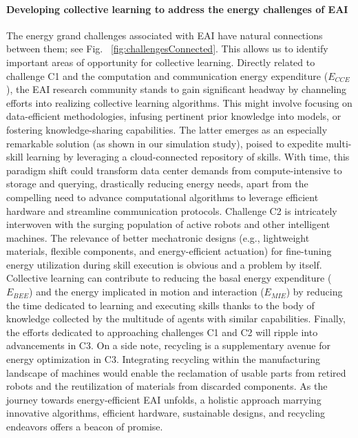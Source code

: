 \documentclass[12pt]{article}
\begin{document}
\paragraph*{Developing collective learning to address the energy challenges of EAI}
The energy grand challenges associated with EAI have natural connections between them; see Fig.~	\ref{fig:challengesConnected}. This allows us to identify important areas of opportunity for collective learning. Directly related to challenge C1 and the computation and communication energy expenditure ($E_{CCE}$), the EAI research community stands to gain significant headway by channeling efforts into realizing collective learning algorithms. This might involve focusing on data-efficient methodologies, infusing pertinent prior knowledge into models, or fostering knowledge-sharing capabilities. The latter emerges as an especially remarkable solution (as shown in our simulation study), poised to expedite multi-skill learning by leveraging a cloud-connected repository of skills. With time, this paradigm shift could transform data center demands from compute-intensive to storage and querying, drastically reducing energy needs, apart from the compelling need to advance computational algorithms to leverage efficient hardware and streamline communication protocols. Challenge C2 is intricately interwoven with the surging population of active robots and other intelligent machines. The relevance of better mechatronic designs (e.g., lightweight materials, flexible components, and energy-efficient actuation) for fine-tuning energy utilization during skill execution is obvious and a problem by itself. Collective learning can contribute to reducing the basal energy expenditure ($E_{BEE}$) and the energy implicated in motion and interaction ($E_{MIE}$) by reducing the time dedicated to learning and executing skills thanks to the body of knowledge collected by the multitude of agents with similar capabilities. Finally, the efforts dedicated to approaching challenges C1 and C2 will ripple into advancements in C3. On a side note, recycling is a supplementary avenue for energy optimization in C3. Integrating recycling within the manufacturing landscape of machines would enable the reclamation of usable parts from retired robots and the reutilization of materials from discarded components. As the journey towards energy-efficient EAI unfolds, a holistic approach marrying innovative algorithms, efficient hardware, sustainable designs, and recycling endeavors offers a beacon of promise.
\end{document}
